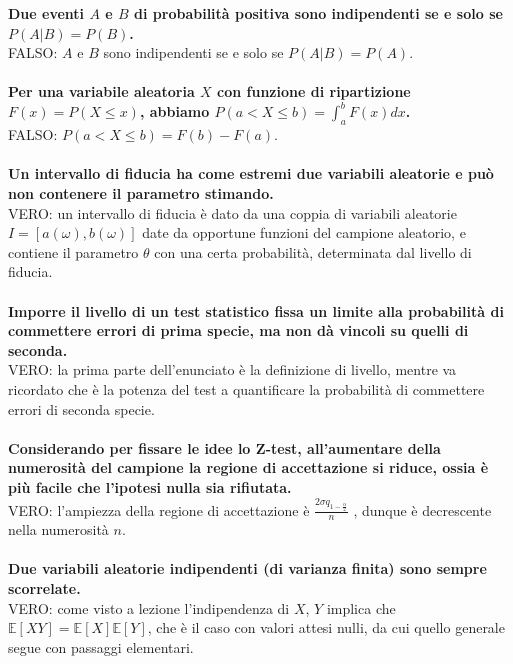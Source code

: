 \noindent \textbf{Due eventi $A$ e $B$ di probabilità positiva sono indipendenti se e solo se $P(A \vert B) = P (B)$.}\\
FALSO: $A$ e $B$ sono indipendenti se e solo se $P(A \vert B) = P (A)$.\\\\

\noindent \textbf{Per una variabile aleatoria $X$ con funzione di ripartizione $F (x) = P (X \leq x)$, abbiamo $P (a < X \leq b) = \int_{a }^{b}F(x)dx$.}\\
FALSO: $P(a < X \leq b) = F(b) - F(a)$. \\\\

\noindent \textbf{Un intervallo di fiducia ha come estremi due variabili aleatorie e può non contenere il parametro stimando.}\\
VERO: un intervallo di fiducia è dato da una coppia di variabili aleatorie $I = [a(\omega), b(\omega)]$ date da opportune funzioni del campione aleatorio, e contiene il parametro $\theta$ con una certa probabilità, determinata dal livello di fiducia.\\\\

\noindent\textbf{Imporre il livello di un test statistico fissa un limite alla probabilità di commettere errori di prima specie, ma non dà vincoli su quelli di seconda.}\\
VERO: la prima parte dell'enunciato è la definizione di livello, mentre va ricordato che è la potenza del test a quantificare la probabilità di commettere errori di seconda specie.\\\\

\noindent \textbf{Considerando per fissare le idee lo Z-test, all'aumentare della numerosità del campione la regione di accettazione si riduce, ossia è più facile che l’ipotesi nulla sia rifiutata.} \\
VERO: l’ampiezza della regione di accettazione è $\frac{2\sigma q_{1-\frac{\alpha}{2}}}{n}$ , dunque è decrescente nella numerosità $n$.\\\\

\noindent \textbf{Due variabili aleatorie indipendenti (di varianza finita) sono sempre scorrelate.}\\
VERO: come visto a lezione l’indipendenza di $X$, $Y$ implica che $\mathbb{E}[XY] = \mathbb{E}[X]\mathbb{E}[Y]$, che è il caso con valori attesi nulli, da cui quello generale segue con passaggi elementari. \\\\

